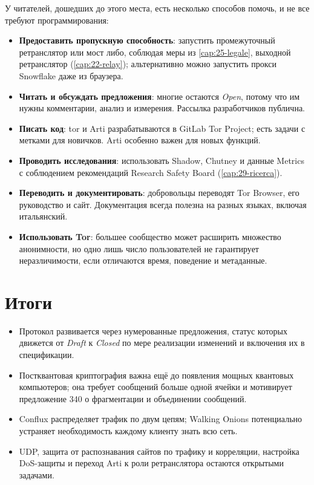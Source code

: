 У читателей, дошедших до этого места, есть несколько способов помочь, и не все требуют программирования:
\begin{itemize}
  \item \textbf{Предоставить пропускную способность}: запустить промежуточный ретранслятор или мост либо, соблюдая меры из \cref{cap:25-legale}, выходной ретранслятор (\cref{cap:22-relay}); альтернативно можно запустить прокси Snowflake даже из браузера.
  \item \textbf{Читать и обсуждать предложения}: многие остаются \emph{Open}, потому что им нужны комментарии, анализ и измерения. Рассылка разработчиков публична.
  \item \textbf{Писать код}: tor и Arti разрабатываются в GitLab Tor Project; есть задачи с метками для новичков. Arti особенно важен для новых функций.
  \item \textbf{Проводить исследования}: использовать Shadow, Chutney и данные Metrics с соблюдением рекомендаций Research Safety Board (\cref{cap:29-ricerca}).
  \item \textbf{Переводить и документировать}: добровольцы переводят Tor Browser, его руководство и сайт. Документация всегда полезна на разных языках, включая итальянский.
  \item \textbf{Использовать Tor}: большее сообщество может расширить множество анонимности, но одно лишь число пользователей не гарантирует неразличимости, если отличаются время, поведение и метаданные.
\end{itemize}

\section*{Итоги}
\begin{itemize}
  \item Протокол развивается через нумерованные предложения, статус которых движется от \emph{Draft} к \emph{Closed} по мере реализации изменений и включения их в спецификации.
  \item Постквантовая криптография важна ещё до появления мощных квантовых компьютеров; она требует сообщений больше одной ячейки и мотивирует предложение 340 о фрагментации и объединении сообщений.
  \item Conflux распределяет трафик по двум цепям; Walking Onions потенциально устраняет необходимость каждому клиенту знать всю сеть.
  \item UDP, защита от распознавания сайтов по трафику и корреляции, настройка DoS-защиты и переход Arti к роли ретранслятора остаются открытыми задачами.
\end{itemize}

